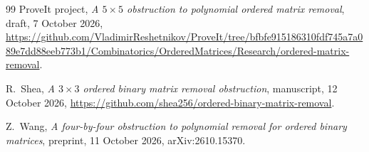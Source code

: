 \documentclass{article}
\theoremstyle{plain}
\theoremstyle{definition}
\begin{document}
\begin{thebibliography}{99}
  ProveIt project, \emph{A $5\times5$ obstruction to polynomial ordered matrix
  removal}, draft, 7 October 2026,
  \url{https://github.com/VladimirReshetnikov/ProveIt/tree/bfbfe915186310fdf745a7a089e7dd88eeb773b1/Combinatorics/OrderedMatrices/Research/ordered-matrix-removal}.

  R.~Shea, \emph{A $3\times3$ ordered binary matrix removal obstruction},
  manuscript, 12 October 2026,
  \url{https://github.com/shea256/ordered-binary-matrix-removal}.

  Z.~Wang, \emph{A four-by-four obstruction to polynomial removal for ordered
  binary matrices}, preprint, 11 October 2026, arXiv:2610.15370.

  \end{thebibliography}
\end{document}
